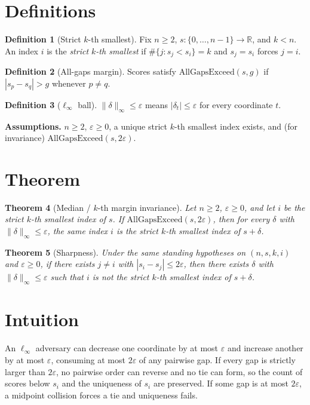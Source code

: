 \documentclass[12pt]{article}
\theoremstyle{plain}
\newtheorem{theorem}{Theorem}
\theoremstyle{definition}
\newtheorem{definition}[theorem]{Definition}
\theoremstyle{remark}
\begin{document}
\section{Definitions}
\begin{definition}[Strict $k$-th smallest]
Fix $n\ge 2$, $s:\{0,\dots,n-1\}\to\mathbb{R}$, and $k<n$. An index $i$ is the \emph{strict $k$-th smallest} if $\#\{j:s_j<s_i\}=k$ and $s_j=s_i$ forces $j=i$.
\end{definition}

\begin{definition}[All-gaps margin]
Scores satisfy $\mathrm{AllGapsExceed}(s,g)$ if $|s_p-s_q|>g$ whenever $p\neq q$.
\end{definition}

\begin{definition}[$\ell_\infty$ ball]
$\|\delta\|_\infty\le\varepsilon$ means $|\delta_t|\le\varepsilon$ for every coordinate $t$.
\end{definition}

\noindent\textbf{Assumptions.} $n\ge 2$, $\varepsilon\ge 0$, a unique strict $k$-th smallest index exists, and (for invariance) $\mathrm{AllGapsExceed}(s,2\varepsilon)$.

\section{Theorem}
\begin{theorem}[Median / $k$-th margin invariance]\label{thm:inv}
Let $n\ge 2$, $\varepsilon\ge 0$, and let $i$ be the strict $k$-th smallest index of $s$. If $\mathrm{AllGapsExceed}(s,2\varepsilon)$, then for every $\delta$ with $\|\delta\|_\infty\le\varepsilon$, the same index $i$ is the strict $k$-th smallest index of $s+\delta$.
\end{theorem}

\begin{theorem}[Sharpness]\label{thm:sharp}
Under the same standing hypotheses on $(n,s,k,i)$ and $\varepsilon\ge 0$, if there exists $j\neq i$ with $|s_i-s_j|\le 2\varepsilon$, then there exists $\delta$ with $\|\delta\|_\infty\le\varepsilon$ such that $i$ is \emph{not} the strict $k$-th smallest index of $s+\delta$.
\end{theorem}

\section{Intuition}
An $\ell_\infty$ adversary can decrease one coordinate by at most $\varepsilon$ and increase another by at most $\varepsilon$, consuming at most $2\varepsilon$ of any pairwise gap. If every gap is strictly larger than $2\varepsilon$, no pairwise order can reverse and no tie can form, so the count of scores below $s_i$ and the uniqueness of $s_i$ are preserved. If some gap is at most $2\varepsilon$, a midpoint collision forces a tie and uniqueness fails.
\end{document}
